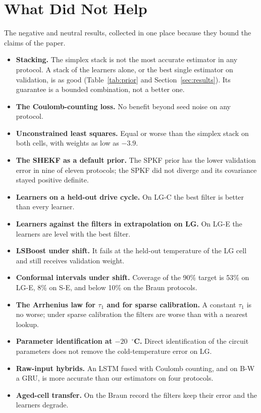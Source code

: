\documentclass[journal]{IEEEtran}
\begin{document}
\section{What Did Not Help}\label{sec:neg}
The negative and neutral results, collected in one place because they bound the claims of the paper.
\begin{itemize}
\item \textbf{Stacking.} The simplex stack is not the most accurate estimator in any protocol. A stack of the learners alone, or the best single estimator on validation, is as good (Table~\ref{tab:prior} and Section~\ref{sec:results}). Its guarantee is a bounded combination, not a better one.
\item \textbf{The Coulomb-counting loss.} No benefit beyond seed noise on any protocol.
\item \textbf{Unconstrained least squares.} Equal or worse than the simplex stack on both cells, with weights as low as $-3.9$.
\item \textbf{The SHEKF as a default prior.} The SPKF prior has the lower validation error in nine of eleven protocols; the SPKF did not diverge and its covariance stayed positive definite.
\item \textbf{Learners on a held-out drive cycle.} On LG-C the best filter is better than every learner.
\item \textbf{Learners against the filters in extrapolation on LG.} On LG-E the learners are level with the best filter.
\item \textbf{LSBoost under shift.} It fails at the held-out temperature of the LG cell and still receives validation weight.
\item \textbf{Conformal intervals under shift.} Coverage of the 90\% target is 53\% on LG-E, 8\% on S-E, and below 10\% on the Braun protocols.
\item \textbf{The Arrhenius law for $\tau_1$ and for sparse calibration.} A constant $\tau_1$ is no worse; under sparse calibration the filters are worse than with a nearest lookup.
\item \textbf{Parameter identification at $-20$~$^\circ$C.} Direct identification of the circuit parameters does not remove the cold-temperature error on LG.
\item \textbf{Raw-input hybrids.} An LSTM fused with Coulomb counting, and on B-W a GRU, is more accurate than our estimators on four protocols.
\item \textbf{Aged-cell transfer.} On the Braun record the filters keep their error and the learners degrade.
\end{itemize}
\end{document}
